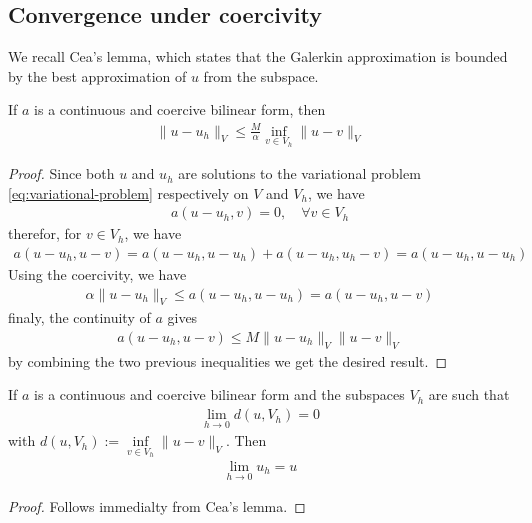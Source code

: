 \subsection{Convergence under coercivity}
We recall Cea's lemma, which states that the Galerkin approximation is bounded by the best approximation of $u$ from the subspace.
\begin{lemma}[Cea]
  If $a$ is a continuous and coercive bilinear form, then
  \begin{align}
    \| u-u_h \|_V \leq \frac{M}{\alpha} \inf\limits_{v \in V_h} \| u-v \|_V
    \label{eq:cea-ineq}
  \end{align}
  \label{lemma:cea}
\end{lemma}
\begin{proof}
  Since both $u$ and $u_h$ are solutions to the variational problem \eqref{eq:variational-problem} respectively on $V$ and $V_h$, we have 
  \begin{align*}
    a(u-u_h, v) = 0, \quad \forall v \in V_h
  \end{align*}
  therefor, for $v \in V_h$, we have
  \begin{align*}
    a(u-u_h, u-v) = a(u-u_h, u-u_h) + a(u-u_h, u_h-v) = a(u-u_h, u-u_h) 
  \end{align*}
  Using the coercivity, we have
  \begin{align*}
    \alpha \| u-u_h \|_V \leq a(u-u_h, u-u_h) = a(u-u_h, u-v) 
  \end{align*}
  finaly, the continuity of $a$ gives
  \begin{align*}
   a(u-u_h, u-v) \leq M \|u-u_h \|_V \|u-v \|_V 
  \end{align*}
  by combining the two previous inequalities we get the desired result.
\end{proof}
\begin{theorem}
  If $a$ is a continuous and coercive bilinear form and the subspaces $V_h$ are such that 
  \begin{align}
    \lim\limits_{h \rightarrow 0} d(u,V_h) = 0
    \label{eq:cvg-space-cond}
  \end{align}
  with $d(u,V_h) := \inf\limits_{v \in V_h} \| u-v \|_V$.
  Then 
  \begin{align*}
    \lim\limits_{h \rightarrow 0} u_h = u 
  \end{align*}
\end{theorem}
\begin{proof}
  Follows immedialty from Cea's lemma.
\end{proof}

